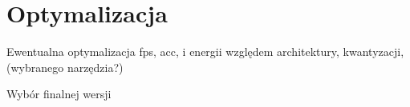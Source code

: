 \chapter{Optymalizacja}
\label{cha:Optymalizacja}

Ewentualna optymalizacja fps, acc, i energii względem architektury, kwantyzacji, (wybranego narzędzia?)

Wybór finalnej wersji